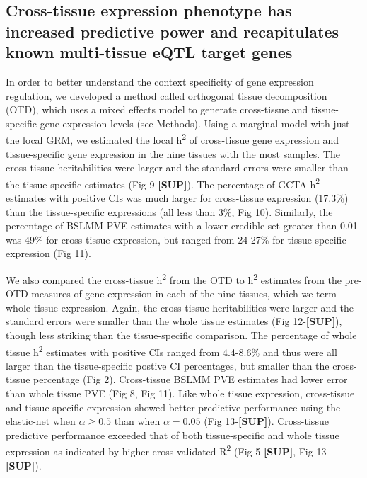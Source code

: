 \documentclass[]{article}
\begin{document}
\subsection{Cross-tissue expression phenotype has increased predictive
power and recapitulates known multi-tissue eQTL target
genes}\label{cross-tissue-expression-phenotype-has-increased-predictive-power-and-recapitulates-known-multi-tissue-eqtl-target-genes}

In order to better understand the context specificity of gene expression
regulation, we developed a method called orthogonal tissue decomposition
(OTD), which uses a mixed effects model to generate cross-tissue and
tissue-specific gene expression levels (see Methods). Using a marginal
model with just the local GRM, we estimated the local
h\textsuperscript{2} of cross-tissue gene expression and tissue-specific
gene expression in the nine tissues with the most samples. The
cross-tissue heritabilities were larger and the standard errors were
smaller than the tissue-specific estimates (Fig 9-\textbf{{[}SUP{]}}).
The percentage of GCTA h\textsuperscript{2} estimates with positive CIs
was much larger for cross-tissue expression (17.3\%) than the
tissue-specific expressions (all less than 3\%, Fig 10). Similarly, the
percentage of BSLMM PVE estimates with a lower credible set greater than
0.01 was 49\% for cross-tissue expression, but ranged from 24-27\% for
tissue-specific expression (Fig 11).

We also compared the cross-tissue h\textsuperscript{2} from the OTD to
h\textsuperscript{2} estimates from the pre-OTD measures of gene
expression in each of the nine tissues, which we term whole tissue
expression. Again, the cross-tissue heritabilities were larger and the
standard errors were smaller than the whole tissue estimates (Fig
12-\textbf{{[}SUP{]}}), though less striking than the tissue-specific
comparison. The percentage of whole tissue h\textsuperscript{2}
estimates with positive CIs ranged from 4.4-8.6\% and thus were all
larger than the tissue-specific postive CI percentages, but smaller than
the cross-tissue percentage (Fig 2). Cross-tissue BSLMM PVE estimates
had lower error than whole tissue PVE (Fig 8, Fig 11). Like whole tissue
expression, cross-tissue and tissue-specific expression showed better
predictive performance using the elastic-net when \(\alpha \geq 0.5\)
than when \(\alpha=0.05\) (Fig 13-\textbf{{[}SUP{]}}). Cross-tissue
predictive performance exceeded that of both tissue-specific and whole
tissue expression as indicated by higher cross-validated
R\textsuperscript{2} (Fig 5-\textbf{{[}SUP{]}}, Fig
13-\textbf{{[}SUP{]}}).
\end{document}
